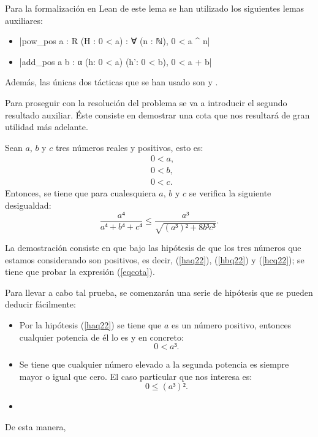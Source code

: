 Para la formalización en Lean de este lema se han utilizado los
siguientes lemas auxiliares:
\begin{itemize}
\item {}|pow_pos {a : R} (H : 0 < a) : ∀ (n : ℕ), 0 < a ^ n|
\item {}|add_pos {a b : α} (h: 0 < a) (h': 0 < b), 0 < a + b|
\end{itemize}

Además, las únicas dos tácticas que se han usado son
 y
.

Para proseguir con la resolución del problema se va a introducir el
segundo resultado auxiliar. Éste consiste en demostrar una cota que
nos resultará de gran utilidad más adelante.

\begin{lema}\label{lemacota}
  Sean \(a\), \(b\) y \(c\) tres números reales y positivos, esto es:
  \begin{align}
    &0<a, \label{haq22}\tag{ha}\\
    &0<b, \label{hbq22}\tag{hb}\\
    &0<c. \label{hcq22}\tag{hc}
  \end{align}
  Entonces, se tiene que para cualesquiera \(a\), \(b\) y \(c\) se
  verifica la siguiente desigualdad:
  \begin{equation}\label{eqcota}
    \frac{a⁴}{a⁴+b⁴+c⁴} ≤ \frac{a³}{\sqrt{(a³)²+8b³c³}}.
  \end{equation}
\end{lema}

\begin{demostracion}
  La demostración consiste en que bajo las hipótesis de que los
  tres números que estamos considerando son positivos, es decir,
  (\ref{haq22}), (\ref{hbq22}) y (\ref{hcq22}); se tiene que probar
  la expresión (\ref{eqcota}).

  Para llevar a cabo tal prueba, se comenzarán una serie de hipótesis
  que se pueden deducir fácilmente:
  \begin{itemize}
  \item Por la hipótesis (\ref{haq22}) se tiene que \(a\) es un
    número positivo, entonces cualquier potencia de él lo es y en
    concreto:
    \begin{equation}\label{ha3}\tag{ha3}
      0<a³.
    \end{equation}

  \item Se tiene que cualquier número elevado a la segunda potencia
    es siempre mayor o igual que cero. El caso particular que nos
    interesa es:
    \begin{equation}\label{ha32}\tag{ha32}
      0≤(a³)².
    \end{equation}

    \item 
  \end{itemize}

  De esta manera, 
\end{demostracion}

